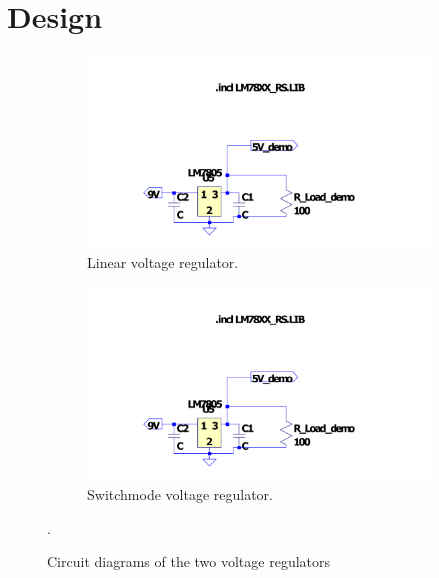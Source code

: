 \section{Design} \label{sec:pwr_design}
\begin{figure}
 \footnotesize
   \centering
   \begin{subfigure}[]{0.45\textwidth}
        \includegraphics[width=\linewidth]{./Figures/E344_Ass1VoltRegulator_cct}
	  \caption{Linear voltage regulator.} \label{subfig:linear_circuit_diagram}	
   \end{subfigure}
   \begin{subfigure}[]{0.45\textwidth}
  	 \includegraphics[width=\linewidth]{./Figures/E344_Ass1VoltRegulator_cct}
	  \caption{Switchmode voltage regulator.} \label{subfig:switchmode_circuit_diagram}	
   \end{subfigure}
   \caption {Circuit diagrams of the two voltage regulators}.

      \label{fig:circuit_diagram}
 \end{figure}

